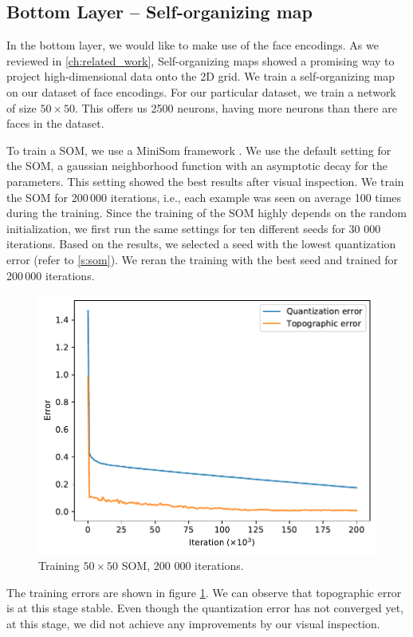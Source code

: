 \subsection{Bottom Layer -- Self-organizing map}

In the bottom layer, we would like to make use of the face encodings. As we reviewed in \autoref{ch:related_work}, Self-organizing maps showed a promising way to project high-dimensional data onto the 2D grid. We train a self-organizing map on our dataset of face encodings. For our particular dataset, we train a network of size $50\times 50$. This offers us 2500 neurons, having more neurons than there are faces in the dataset.

To train a SOM, we use a MiniSom framework \citep{vettigli2013minisom}. We use the default setting for the SOM, a gaussian neighborhood function with an asymptotic decay for the parameters. This setting showed the best results after visual inspection. We train the SOM for 200\,000 iterations, i.e., each example was seen on average 100 times during the training. Since the training of the SOM highly depends on the random initialization, we first run the same settings for ten different seeds for 30 000 iterations. Based on the results, we selected a seed with the lowest quantization error (refer to \autoref{s:som}). We reran the training with the best seed and trained for 200\,000 iterations.

\begin{figure}
    \centering
    \includegraphics[width=0.8\linewidth]{graphs/som_errors.pdf}
    \caption{Training $50\times50$ SOM, 200 000 iterations.}
    \label{fig:som_training}
\end{figure}

The training errors are shown in figure \ref{fig:som_training}. We can observe that topographic error is at this stage stable. Even though the quantization error has not converged yet, at this stage, we did not achieve any improvements by our visual inspection.

